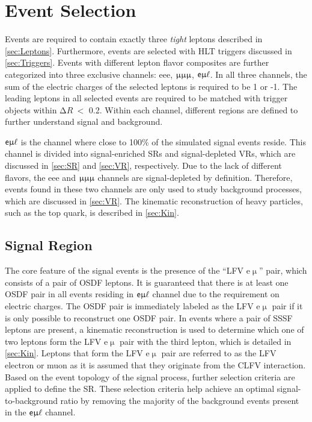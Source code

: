 \chapter{Event Selection}
\label{chap:Selection}

Events are required to contain exactly three \emph{tight} leptons described in \autoref{sec:Leptons}. Furthermore, events are selected with \ac{HLT} triggers discussed in \autoref{sec:Triggers}. Events with different lepton flavor composites are further categorized into three exclusive channels: eee, $\upmu\upmu\upmu$, $\textsf{e}\upmu\ell$. In all three channels, the sum of the electric charges of the selected leptons is required to be 1 or -1. The leading leptons in all selected events are required to be matched with trigger objects within $\mathrm{\Delta} R~<$ 0.2. Within each channel, different regions are defined to further understand signal and background.

$\textsf{e}\upmu\ell$ is the channel where close to 100\% of the simulated signal events reside. This channel is divided into signal-enriched \acp{SR} and signal-depleted \acp{VR}, which are discussed in \autoref{sec:SR} and \autoref{sec:VR}, respectively. Due to the lack of different flavors, the eee and $\upmu\upmu\upmu$ channels are signal-depleted by definition. Therefore, events found in these two channels are only used to study background processes, which are discussed in \autoref{sec:VR}. The kinematic reconstruction of heavy particles, such as the top quark, is described in \autoref{sec:Kin}.
\section{Signal Region}
\label{sec:SR}

The core feature of the signal events is the presence of the ``LFV e$\upmu$'' pair, which consists of a pair of \ac{OSDF} leptons. It is guaranteed that there is at least one \ac{OSDF} pair in all events residing in $\textsf{e}\upmu\ell$ channel due to the requirement on electric charges. The \ac{OSDF} pair is immediately labeled as the LFV e$\upmu$ pair if it is only possible to reconstruct one \ac{OSDF} pair. In events where a pair of \ac{SSSF} leptons are present, a kinematic reconstruction is used to determine which one of two leptons form the LFV e$\upmu$ pair with the third lepton, which is detailed in \autoref{sec:Kin}. Leptons that form the LFV e$\upmu$ pair are referred to as the LFV electron or muon as it is assumed that they originate from the \ac{CLFV} interaction. Based on the event topology of the signal process, further selection criteria are applied to define the \ac{SR}. These selection criteria help achieve an optimal signal-to-background ratio by removing the majority of the background events present in the $\textsf{e}\upmu\ell$ channel. 

